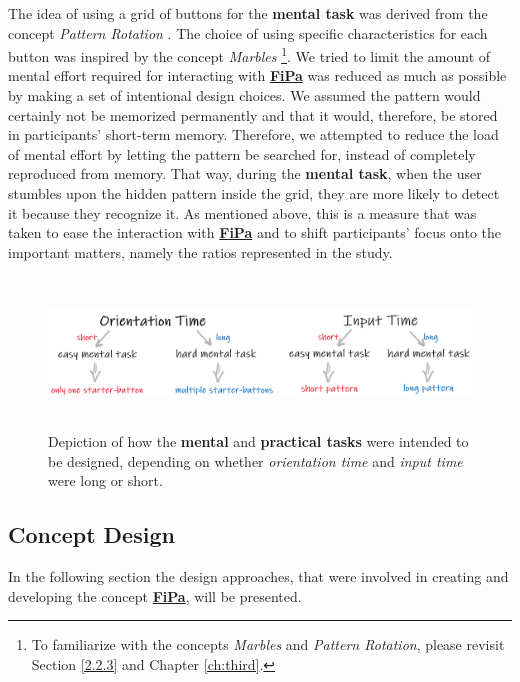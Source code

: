 The idea of using a grid of buttons for the \textbf{mental task} was derived from the concept \textit{Pattern Rotation} \cite{Marbles, Zezschwitz}. The choice of using specific characteristics for each button was inspired by the concept \textit{Marbles} \cite{Marbles, Zezschwitz}\footnote{To familiarize with the concepts \textit{Marbles} and \textit{Pattern Rotation}, please revisit Section \ref{2.2.3} and Chapter \ref{ch:third}.}. We tried to limit the amount of mental effort required for interacting with \underline{\textbf{FiPa}} was reduced as much as possible by making a set of intentional design choices. We assumed the pattern would certainly not be memorized permanently and that it would, therefore, be stored in participants' short-term memory. Therefore, we attempted to reduce the load of mental effort by letting the pattern be searched for, instead of completely reproduced from memory. That way, during the \textbf{mental task}, when the user stumbles upon the hidden pattern inside the grid, they are more likely to detect it because they recognize it. As mentioned above, this is a measure that was taken to ease the interaction with \underline{\textbf{FiPa}} and to shift participants' focus onto the important matters, namely the ratios represented in the study.

\begin{figure}[t!]
\centering
\includegraphics[width=13cm, height=4cm]{Chapters/graphics/OriInput.PNG}
\caption{Depiction of how the \textbf{mental} and \textbf{practical tasks} were intended to be designed, depending on whether \textit{orientation time} and \textit{input time} were long or short.}
\label{fig:orientation_input}
\end{figure}

\subsection{Concept Design} \label{4.2.2}

In the following section the design approaches, that were involved in creating and developing the concept \underline{\textbf{FiPa}}, will be presented.

